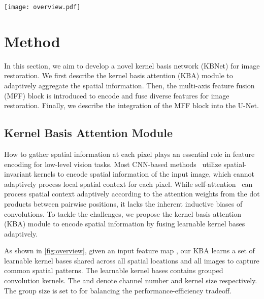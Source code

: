 \documentclass[default,iicol]{sn-jnl}
\theoremstyle{thmstyleone}\newtheorem{theorem}{Theorem}\newtheorem{proposition}[theorem]{Proposition}
\theoremstyle{thmstyletwo}\newtheorem{example}{Example}\newtheorem{remark}{Remark}
\theoremstyle{thmstylethree}\newtheorem{definition}{Definition}
\begin{document}
\begin{figure*}[t]
    \centering
    \texttt{[image: overview.pdf]}
    \caption{An overview of kernel basis attention (KBA) Module. With the input feature map , the KBA module first predicts the fusion coefficient map  to linearly fuse the learnable kernel bases  for each location. Then, the fused kernel weights  adaptively encode the local neighborhood of the enhanced feature map  to produce the output feature map .}
    \label{fig:overview}
\end{figure*}

\section{Method}
In this section, we aim to develop a novel kernel basis network (KBNet) for image restoration.
We first describe the kernel basis attention (KBA) module to adaptively aggregate the spatial information. Then, the multi-axis feature fusion (MFF) block is introduced to encode and fuse diverse features for image restoration.
Finally, we describe the integration of the MFF block into the U-Net.


\subsection{Kernel Basis Attention Module}
How to gather spatial information at each pixel plays an essential role in feature encoding for low-level vision tasks. Most CNN-based methods~\cite {DnCNN,cheng2021nbnet,RIDNet} utilize spatial-invariant kernels to encode spatial information of the input image, which cannot adaptively process local spatial context for each pixel.
While self-attention~\cite{tu2022maxim,wang2021uformer,liang2021swinir} 
 can process spatial context adaptively according to the attention weights from the dot products between pairwise positions, it lacks the inherent inductive biases of convolutions.
To tackle the challenges, 
we propose the kernel basis attention (KBA) module to encode spatial information by fusing learnable kernel bases adaptively.

As shown in \cref{fig:overview}, given an input feature map , our KBA learns a set of learnable kernel bases  shared across all spatial locations and all images to capture common spatial patterns.
The learnable kernel bases  contains  grouped convolution kernels.
The  and  denote channel number and kernel size respectively. The group size is set to  for balancing the performance-efficiency tradeoff.
\end{document}
